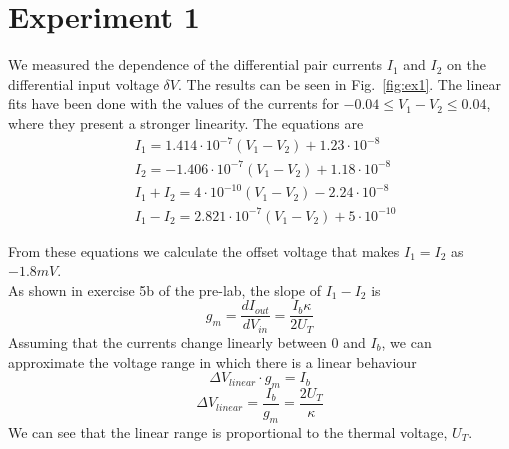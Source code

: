 

\newcommand{\reffig}[1]{Fig.~\ref{#1}}



\newpage
\section{Experiment 1}

We measured the dependence of the differential pair currents \(I_1\) and \(I_2\) on the differential input voltage \(\delta V\). The results can be seen in \reffig{fig:ex1}. The linear fits have been done with the values of the currents for \(-0.04 \le V_1-V_2 \le 0.04\), where they present a stronger linearity. The equations are
\begin{align*}
&I_1  = 1.414\cdot10^{-7}(V_1-V_2 )+1.23\cdot10^{-8} \\
&I_2  = -1.406\cdot10^{-7}(V_1-V_2 )+1.18\cdot10^{-8} \\
&I_1+I_2  = 4\cdot10^{-10}(V_1-V_2 )-2.24\cdot10^{-8} \\
&I_1-I_2  = 2.821\cdot10^{-7}(V_1-V_2 )+5\cdot10^{-10}
\end{align*}

From these equations we calculate the offset voltage that makes \(I_1=I_2\) as \(-1.8 mV\). \\

As shown in exercise 5b of the pre-lab, the slope of \(I_1-I_2\) is
\begin{equation*}
g_m = \frac{dI_{out}}{dV_{in}} = \frac{I_b\kappa}{2U_T}
\end{equation*}
%
Assuming that the currents change linearly between 0 and \(I_b\), we can approximate the voltage range in which there is a linear behaviour
\begin{equation*}
\Delta V_{linear} \cdot g_m = I_b
\end{equation*}
\begin{equation*}
\Delta V_{linear} = \frac{I_b}{g_m}=\frac{2U_T}{\kappa}
\end{equation*}
We can see that the linear range is proportional to the thermal voltage, \(U_T\).\\

